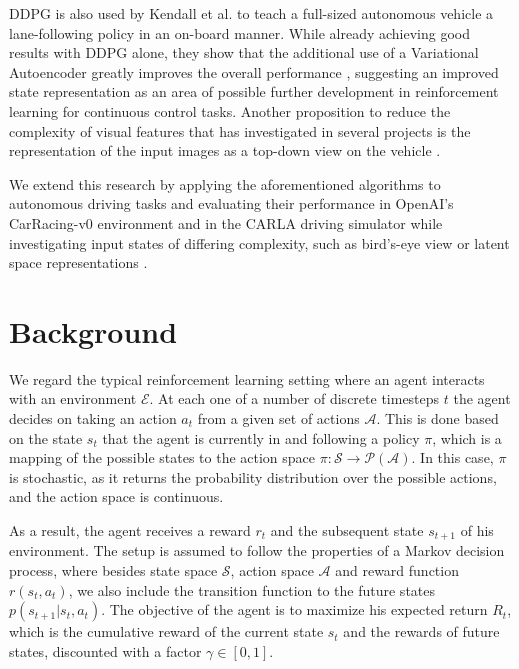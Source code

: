 \documentclass[letterpaper, 10 pt, conference]{ieeeconf}  %
\begin{document}
DDPG is also used by Kendall et al. to teach a full-sized autonomous vehicle a lane-following policy in an on-board manner. While already achieving good results with DDPG alone, they show that the additional use of a Variational Autoencoder greatly improves the overall performance \cite{kendall2019learning}, suggesting an improved state representation as an area of possible further development in reinforcement learning for continuous control tasks. Another proposition to reduce the complexity of visual features that has investigated in several projects is the representation of the input images as a top-down view on the vehicle \cite{DBLP:journals/corr/abs-1812-03079}\cite{DBLP:journals/corr/abs-1903-00640}\cite{Djuric2018ShorttermMP}.

We extend this research by applying the aforementioned algorithms to autonomous driving tasks and evaluating their performance in OpenAI's CarRacing-v0 environment and in the CARLA driving simulator while investigating input states of differing complexity, such as bird's-eye view or latent space representations \cite{dosovitskiy2017carla}.


\section{Background}

We regard the typical reinforcement learning setting where an agent interacts with an environment $\mathcal{E}$. At each one of a number of discrete timesteps $t$ the agent decides on taking an action $a_t$ from a given set of actions $\mathcal{A}$. This is done based on the state $s_t$ that the agent is currently in and following a policy $\pi$, which is a mapping of the possible states to the action space $\pi: \mathcal{S} \rightarrow \mathcal{P}(\mathcal{A})$. In this case, $\pi$ is stochastic, as it returns the probability distribution over the possible actions, and the action space is continuous.

As a result, the agent receives a reward $r_t$ and the subsequent state $s_{t+1}$ of his environment. The setup is assumed to follow the properties of a Markov decision process, where besides state space $\mathcal{S}$, action space $\mathcal{A}$ and reward function $r(s_t,a_t)$, we also include the transition function to the future states $p(s_{t+1}|s_t,a_t)$. The objective of the agent is to maximize his expected return $R_t$, which is the cumulative reward of the current state $s_t$ and the rewards of future states, discounted with a factor $\gamma \in [0,1]$.
\end{document}
